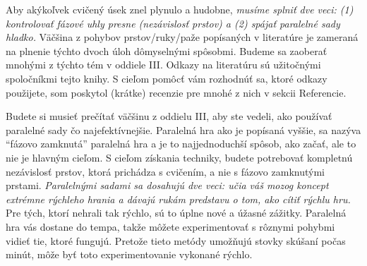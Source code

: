 Aby akýkoľvek cvičený úsek znel plynulo a hudobne, \emph{musíme splniť dve veci: (1) kontrolovať fázové uhly presne (nezávislosť prstov) a (2) spájať paralelné sady hladko.} Väčšina z pohybov prstov/ruky/paže popísaných v literatúre je zameraná na plnenie týchto dvoch úloh dômyselnými spôsobmi. Budeme sa zaoberať mnohými z týchto tém v oddiele III. Odkazy na literatúru sú užitočnými spoločníkmi tejto knihy. S cieľom pomôcť vám rozhodnúť sa, ktoré odkazy použijete, som poskytol (krátke) recenzie pre mnohé z nich v sekcii Referencie.

Budete si musieť prečítať väčšinu z oddielu III, aby ste vedeli, ako používať paralelné sady  čo najefektívnejšie. Paralelná hra ako je popísaná vyššie, sa nazýva “fázovo zamknutá” paralelná hra a je to najjednoduchší spôsob, ako začať, ale to nie je hlavným cieľom. S cieľom získania techniky, budete potrebovať kompletnú nezávislosť prstov, ktorá prichádza s cvičením, a nie s fázovo zamknutými prstami. \emph{Paralelnými sadami sa dosahujú dve veci: učia váš mozog koncept extrémne rýchleho hrania a dávajú rukám predstavu o tom, ako cítiť rýchlu hru.} Pre tých, ktorí nehrali tak rýchlo, sú to úplne nové a úžasné zážitky. Paralelná hra vás dostane do tempa, takže môžete experimentovať s rôznymi pohybmi vidieť tie, ktoré fungujú. Pretože tieto metódy umožňujú stovky skúšaní počas minút, môže byť toto experimentovanie vykonané rýchlo.

